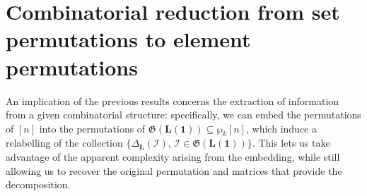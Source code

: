 \documentclass[10pt]{article}
\theoremstyle{remark}%
\theoremstyle{definition}%
\begin{document}
\section{Combinatorial reduction from set permutations to element permutations}
\label{sec: Reduction of multi-valued maps and applications to permutation coding}

An implication of the previous results concerns the extraction of information from a given combinatorial structure: specifically, we can embed the permutations of $[n]$ into the permutations of $\mathfrak{G}(\mathbf{L}(\mathbf{1}))\subseteq \wp_{k}[n]$, which induce a relabelling of the collection $\{\Delta_{\mathbf{L}}(\mathcal{I}),\,\mathcal{I}\in\mathfrak{G}(\mathbf{L}(\mathbf{1}))\}$. This lets us take advantage of the apparent complexity arising from the embedding, while still allowing us to recover the original permutation and matrices that provide the decomposition.
\end{document}
